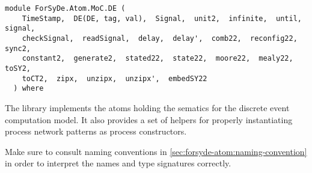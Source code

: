 \label{module:ForSyDe.Atom.MoC.DE}
\haddockbeginheader
{\haddockverb\begin{verbatim}
module ForSyDe.Atom.MoC.DE (
    TimeStamp,  DE(DE, tag, val),  Signal,  unit2,  infinite,  until,  signal, 
    checkSignal,  readSignal,  delay,  delay',  comb22,  reconfig22,  sync2, 
    constant2,  generate2,  stated22,  state22,  moore22,  mealy22,  toSY2, 
    toCT2,  zipx,  unzipx,  unzipx',  embedSY22
  ) where\end{verbatim}}
\haddockendheader

The  library implements the atoms holding the sematics for the
 discrete event computation model. It also provides a set of helpers
 for properly instantiating process network patterns as process
 constructors.\par
\begin{mdframed}[style=reminder,frametitle=Reminder]Make sure to consult naming conventions in  \cref{sec:forsyde-atom:naming-convention} in order to interpret the names and type signatures correctly.\end{mdframed}\par

